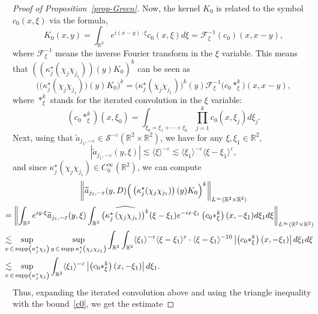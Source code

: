 \documentclass[AHL,Unicode,longabstracts,published]{cedram}
\newcommand{\R}{\mathbb{R}}
\DeclareMathOperator*{\supp}{supp}
\newcommand{\F}{\mathcal{F}}
\renewcommand{\S}{\mathcal{S}}
\newcommand{\eps}{\varepsilon}
\newcommand{\kk}{\kappa}
\newcommand{\wt}{\widetilde}
\newcommand{\les}{\lesssim}
\newcommand{\jb}[1] {\langle #1 \rangle}
\begin{document}
\begin{proof}[Proof of Proposition~\ref{prop-Green}]
Now, the kernel $K_0$ is related to the symbol $c_0(x,\xi)$ via the formula,
\begin{equation*}
K_0(x,y)=\int_{\R^2}e^{i(x-y)\cdot\xi}c_0(x,\xi)d\xi = \F_{\xi}^{-1}(c_0)(x,x-y),
\end{equation*}
where $\F_{\xi}^{-1}$ means the inverse Fourier transform in the $\xi$ variable. This means that 
$((\kk_j^\star(\chi_j\chi_{j_1}))(y)K_0)^k$ can be seen as
\begin{equation*}
\Big(\big(\kk_j^\star(\chi_j\chi_{j_1})\big)(y)K_0\Big)^k = \big(\kk_j^\star(\chi_j\chi_{j_1})\big)^k(y)\F_{\xi}^{-1}\big(c_0 *_{\xi}^k\big)(x,x-y),
\end{equation*}
where $*_{\xi}^k$ stands for the iterated convolution in the $\xi$ variable:
\begin{equation*}
\left(c_0*_{\xi}^k\right)(x,\xi_0) = \int_{\xi_0=\xi_1+\cdots+\xi_k}\prod_{j=1}^k c_0(x,\xi_j)d\xi_j.
\end{equation*}
Next, using that $\wt a_{j_1,-\eps}\in\S^{-\eps}(\R^2\times\R^2)$, we have for any $\xi,\xi_1\in\R^2$,
\begin{equation*}
\left|\wt a_{j_1,-\eps}(y,\xi)\right|\les \jb{\xi}^{-\eps}\les \jb{\xi_1}^{-\eps}\jb{\xi-\xi_1}^{\eps},
\end{equation*}
and since $\kk_j^\star(\chi_j\chi_{j_1})\in C^{\infty}_0(\R^2)$, we can compute
\begin{multline*}
\left\|\wt a_{j_1,-\eps}(y,D)\Big(\left(\kk_j^\star(\chi_j\chi_{j_1})\right)(y)K_0\Big)^k\right\|_{L^{\infty}(\R^2\times\R^2)}\\
\mkern-25mu\begin{aligned}
&= \left\|\int_{\R^2}e^{iy\cdot \xi}\wt a_{j_1,-\eps}(y,\xi)\int_{\R^2}\widehat{\left(\kk_j^\star\left(\chi_j\chi_{j_1}\right)\right)^k}(\xi-\xi_1) e^{-ix\cdot\xi_1}\left(c_0*_{\xi}^k\right)(x,-\xi_1)d\xi_1d\xi\right\|_{L^{\infty}(\R^2\times\R^2)}\\
&\les \mkern-20mu\sup_{x\,\in \,\supp\left(\kk_j^\star\chi_j\right)}\sup_{y\,\in\,\supp\kk_j^\star\left(\chi_j\chi_{j_1}\right)} \int_{\R^2}\int_{\R^2}\jb{\xi_1}^{-\eps}\jb{\xi-\xi_1}^{\eps}\cdot\jb{\xi-\xi_1}^{-10}\left|\left(c_0*_{\xi}^k\right)(x,-\xi_1)\right|d\xi_1d\xi\\
&\les \mkern-20mu\sup_{x\,\in\,\supp\left(\kk_j^\star\chi_j\right)} \int_{\R^2}\jb{\xi_1}^{-\eps}\left|\left(c_0*_{\xi}^k\right)(x,-\xi_1)\right|d\xi_1.
\end{aligned}
\end{multline*}
Thus, expanding the iterated convolution above and using the triangle inequality with the bound~\eqref{c0}, we get the estimate

\end{proof}
\end{document}
